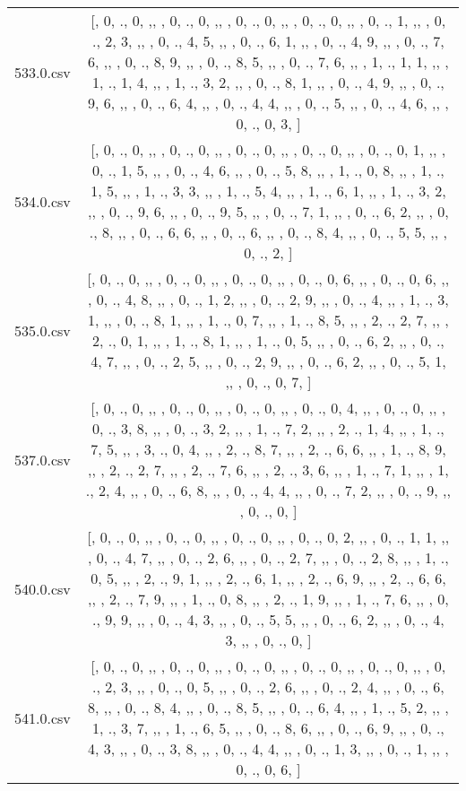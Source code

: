 \begin{table}[ht]
\begin{tabular}{@{}c c@{}}
	533.0.csv & [, 0, ., 0, ,,  , 0, ., 0, ,,  , 0, ., 0, ,,  , 0, ., 0, ,,  , 0, ., 1, ,,  , 0, ., 2, 3, ,,  , 0, ., 4, 5, ,,  , 0, ., 6, 1, ,,  , 0, ., 4, 9, ,,  , 0, ., 7, 6, ,,  , 0, ., 8, 9, ,,  , 0, ., 8, 5, ,,  , 0, ., 7, 6, ,,  , 1, ., 1, 1, ,,  , 1, ., 1, 4, ,,  , 1, ., 3, 2, ,,  , 0, ., 8, 1, ,,  , 0, ., 4, 9, ,,  , 0, ., 9, 6, ,,  , 0, ., 6, 4, ,,  , 0, ., 4, 4, ,,  , 0, ., 5, ,,  , 0, ., 4, 6, ,,  , 0, ., 0, 3, ]\\ 
	534.0.csv & [, 0, ., 0, ,,  , 0, ., 0, ,,  , 0, ., 0, ,,  , 0, ., 0, ,,  , 0, ., 0, 1, ,,  , 0, ., 1, 5, ,,  , 0, ., 4, 6, ,,  , 0, ., 5, 8, ,,  , 1, ., 0, 8, ,,  , 1, ., 1, 5, ,,  , 1, ., 3, 3, ,,  , 1, ., 5, 4, ,,  , 1, ., 6, 1, ,,  , 1, ., 3, 2, ,,  , 0, ., 9, 6, ,,  , 0, ., 9, 5, ,,  , 0, ., 7, 1, ,,  , 0, ., 6, 2, ,,  , 0, ., 8, ,,  , 0, ., 6, 6, ,,  , 0, ., 6, ,,  , 0, ., 8, 4, ,,  , 0, ., 5, 5, ,,  , 0, ., 2, ]\\ 
	535.0.csv & [, 0, ., 0, ,,  , 0, ., 0, ,,  , 0, ., 0, ,,  , 0, ., 0, 6, ,,  , 0, ., 0, 6, ,,  , 0, ., 4, 8, ,,  , 0, ., 1, 2, ,,  , 0, ., 2, 9, ,,  , 0, ., 4, ,,  , 1, ., 3, 1, ,,  , 0, ., 8, 1, ,,  , 1, ., 0, 7, ,,  , 1, ., 8, 5, ,,  , 2, ., 2, 7, ,,  , 2, ., 0, 1, ,,  , 1, ., 8, 1, ,,  , 1, ., 0, 5, ,,  , 0, ., 6, 2, ,,  , 0, ., 4, 7, ,,  , 0, ., 2, 5, ,,  , 0, ., 2, 9, ,,  , 0, ., 6, 2, ,,  , 0, ., 5, 1, ,,  , 0, ., 0, 7, ]\\ 
	537.0.csv & [, 0, ., 0, ,,  , 0, ., 0, ,,  , 0, ., 0, ,,  , 0, ., 0, 4, ,,  , 0, ., 0, ,,  , 0, ., 3, 8, ,,  , 0, ., 3, 2, ,,  , 1, ., 7, 2, ,,  , 2, ., 1, 4, ,,  , 1, ., 7, 5, ,,  , 3, ., 0, 4, ,,  , 2, ., 8, 7, ,,  , 2, ., 6, 6, ,,  , 1, ., 8, 9, ,,  , 2, ., 2, 7, ,,  , 2, ., 7, 6, ,,  , 2, ., 3, 6, ,,  , 1, ., 7, 1, ,,  , 1, ., 2, 4, ,,  , 0, ., 6, 8, ,,  , 0, ., 4, 4, ,,  , 0, ., 7, 2, ,,  , 0, ., 9, ,,  , 0, ., 0, ]\\ 
	540.0.csv & [, 0, ., 0, ,,  , 0, ., 0, ,,  , 0, ., 0, ,,  , 0, ., 0, 2, ,,  , 0, ., 1, 1, ,,  , 0, ., 4, 7, ,,  , 0, ., 2, 6, ,,  , 0, ., 2, 7, ,,  , 0, ., 2, 8, ,,  , 1, ., 0, 5, ,,  , 2, ., 9, 1, ,,  , 2, ., 6, 1, ,,  , 2, ., 6, 9, ,,  , 2, ., 6, 6, ,,  , 2, ., 7, 9, ,,  , 1, ., 0, 8, ,,  , 2, ., 1, 9, ,,  , 1, ., 7, 6, ,,  , 0, ., 9, 9, ,,  , 0, ., 4, 3, ,,  , 0, ., 5, 5, ,,  , 0, ., 6, 2, ,,  , 0, ., 4, 3, ,,  , 0, ., 0, ]\\ 
	541.0.csv & [, 0, ., 0, ,,  , 0, ., 0, ,,  , 0, ., 0, ,,  , 0, ., 0, ,,  , 0, ., 0, ,,  , 0, ., 2, 3, ,,  , 0, ., 0, 5, ,,  , 0, ., 2, 6, ,,  , 0, ., 2, 4, ,,  , 0, ., 6, 8, ,,  , 0, ., 8, 4, ,,  , 0, ., 8, 5, ,,  , 0, ., 6, 4, ,,  , 1, ., 5, 2, ,,  , 1, ., 3, 7, ,,  , 1, ., 6, 5, ,,  , 0, ., 8, 6, ,,  , 0, ., 6, 9, ,,  , 0, ., 4, 3, ,,  , 0, ., 3, 8, ,,  , 0, ., 4, 4, ,,  , 0, ., 1, 3, ,,  , 0, ., 1, ,,  , 0, ., 0, 6, ]\\ 

\end{tabular}
\end{table}
